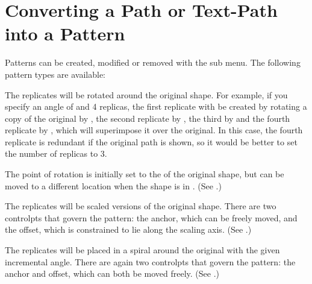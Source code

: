 \section{Converting a Path or Text-Path into a Pattern}\label{sec:patterns}

Patterns can be created, modified or removed with the
 sub menu. The following pattern types
are available:
\begin{deflist}

\begin{itemdesc}
The replicates will be rotated around the original
shape. For example, if you specify an angle of  and 4
replicas, the first replicate with be created by rotating a copy of
the original by , the second replicate by ,
the third by  and the fourth replicate by
, which will superimpose it over the original.
In this case, the fourth replicate is redundant if the original path
is shown, so it would be better to set the number of replicas to 3.

The point of rotation is initially set to the  of the original
shape, but can be moved to a different location when the shape is in
\editpathmode. (See .)

\end{itemdesc}


\begin{itemdesc}
The replicates will be scaled versions of the original
shape. There are two \glspl{controlpt} that govern the pattern: the
anchor, which can be freely moved, and the offset, which is
constrained to lie along the scaling axis. (See
.)
\end{itemdesc}


\begin{itemdesc}
The replicates will be placed in a spiral around the
original with the given incremental angle. There are again two
\glspl{controlpt} that govern the pattern: the anchor and offset,
which can both be moved freely. (See .)
\end{itemdesc}

\end{deflist}

